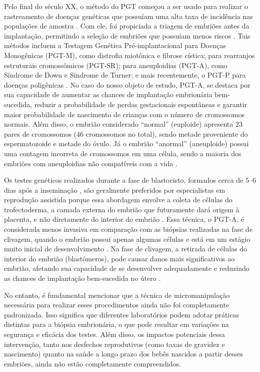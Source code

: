 Pelo final do século XX, o método do PGT começou a ser usado para realizar o rastreamento de doenças genéticas que possuíam uma alta taxa de incidência nas populações de amostra \cite{yang2024}. Com ele, foi propiciada a triagem de embriões antes da implantação, permitindo a seleção de embriões que possuíam menos riscos \cite{scienceofbiogenetics2024}. Tais métodos incluem a Testagem Genética Pré-implantacional para Doenças Monogênicas (PGT-M), como distrofia miotônica e fibrose cística; para rearranjos estruturais cromossômicos (PGT-SR); para aneuploidias (PGT-A), como Síndrome de Down e Síndrome de Turner; e mais recentemente, o PGT-P para doenças poligênicas \cite{yang2024}. No caso do nosso objeto de estudo, PGT-A, se destaca por sua capacidade de aumentar as chances de implantação embrionária bem-sucedida, reduzir a probabilidade de perdas gestacionais espontâneas e garantir maior probabilidade de nascimento de crianças com o número de cromossomos normais\cite{yang2024}. Além disso, o embrião considerado “normal” (euploide) apresenta 23 pares de cromossomos (46 cromossomos no total), sendo metade proveniente do espermatozoide e metade do óvulo. Já o embrião “anormal” (aneuploide) possui uma contagem incorreta de cromossomos em uma célula, sendo a maioria dos embriões com aneuploidias não compatíveis com a vida \cite{zegers2017}.

Os testes genéticos realizados durante a fase de blastocisto, formados cerca de 5{–}6 dias após a inseminação \cite{zegers2017}, são geralmente preferidos por especialistas em reprodução assistida porque essa abordagem envolve a coleta de células do trofectoderma, a camada externa do embrião que futuramente dará origem à placenta, e não diretamente do interior do embrião \cite{leaver2019}. Essa técnica, o PGT-A, é considerada menos invasiva em comparação com as biópsias realizadas na fase de clivagem, quando o embrião possui apenas algumas células e está em um estágio muito inicial de desenvolvimento \cite{leaver2019}. Na fase de clivagem, a retirada de células do interior do embrião (blastômeros), pode causar danos mais significativos ao embrião, afetando sua capacidade de se desenvolver adequadamente e reduzindo as chances de implantação bem-sucedida no útero \cite{leaver2019}. 

No entanto, é fundamental mencionar que a técnica de micromanipulação necessária para realizar esses procedimentos ainda não foi completamente padronizada. Isso significa que diferentes laboratórios podem adotar práticas distintas para a biópsia embrionária, o que pode resultar em variações na segurança e eficácia dos testes. Além disso, os impactos potenciais dessa intervenção, tanto nos desfechos reprodutivos (como taxas de gravidez e nascimento) quanto na saúde a longo prazo dos bebês nascidos a partir desses embriões, ainda não estão completamente compreendidos.

